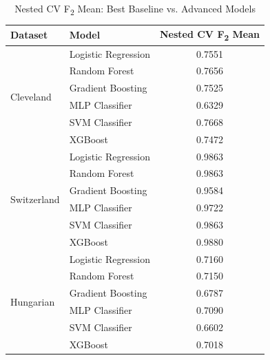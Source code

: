 \documentclass{article}
\begin{document}
\begin{table}[htbp]
\centering
\caption{Nested CV F\textsubscript{2} Mean: Best Baseline vs. Advanced Models}
\label{tab:advanced_comparison_nested}
\begin{tabular}{llc} %
\toprule
Dataset     & Model                & Nested CV F\textsubscript{2} Mean \\
\midrule
\multirow{6}{*}{Cleveland} & Logistic Regression  & 0.7551    \\
           & Random Forest        & 0.7656    \\
           & Gradient Boosting    & 0.7525    \\
           & MLP Classifier       & 0.6329    \\
           & SVM Classifier       & 0.7668    \\
           & XGBoost              & 0.7472    \\
\midrule
\multirow{6}{*}{Switzerland} & Logistic Regression  & 0.9863    \\
           & Random Forest        & 0.9863    \\
           & Gradient Boosting    & 0.9584    \\
           & MLP Classifier       & 0.9722    \\
           & SVM Classifier       & 0.9863    \\
           & XGBoost              & 0.9880    \\
\midrule
\multirow{6}{*}{Hungarian} & Logistic Regression  & 0.7160    \\
           & Random Forest        & 0.7150    \\
           & Gradient Boosting    & 0.6787    \\
           & MLP Classifier       & 0.7090    \\
           & SVM Classifier       & 0.6602    \\
           & XGBoost              & 0.7018    \\
\bottomrule
\end{tabular}
\end{table}
\end{document}
